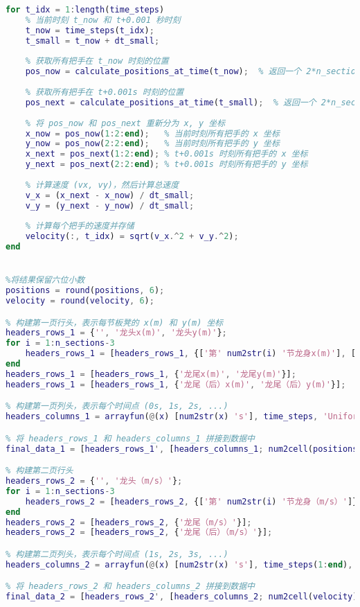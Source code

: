 \documentclass[withoutpreface,bwprint]{cumcmthesis1} %
\begin{document}
\begin{appendices}
\begin{lstlisting}[language=matlab]
% 计算整数秒之间的速度，使用 t 和 t+0.0001 之间的位移来计算
for t_idx = 1:length(time_steps)
    % 当前时刻 t_now 和 t+0.001 秒时刻
    t_now = time_steps(t_idx);
    t_small = t_now + dt_small;
    
    % 获取所有把手在 t_now 时刻的位置
    pos_now = calculate_positions_at_time(t_now);  % 返回一个 2*n_sections 大小的向量
    
    % 获取所有把手在 t+0.001s 时刻的位置
    pos_next = calculate_positions_at_time(t_small);  % 返回一个 2*n_sections 大小的向量
    
    % 将 pos_now 和 pos_next 重新分为 x, y 坐标
    x_now = pos_now(1:2:end);   % 当前时刻所有把手的 x 坐标
    y_now = pos_now(2:2:end);   % 当前时刻所有把手的 y 坐标
    x_next = pos_next(1:2:end); % t+0.001s 时刻所有把手的 x 坐标
    y_next = pos_next(2:2:end); % t+0.001s 时刻所有把手的 y 坐标
    
    % 计算速度 (vx, vy)，然后计算总速度
    v_x = (x_next - x_now) / dt_small;
    v_y = (y_next - y_now) / dt_small;
    
    % 计算每个把手的速度并存储
    velocity(:, t_idx) = sqrt(v_x.^2 + v_y.^2);
end


%将结果保留六位小数
positions = round(positions, 6);
velocity = round(velocity, 6);

% 构建第一页行头，表示每节板凳的 x(m) 和 y(m) 坐标
headers_rows_1 = {'', '龙头x(m)', '龙头y(m)'};
for i = 1:n_sections-3
    headers_rows_1 = [headers_rows_1, {['第' num2str(i) '节龙身x(m)'], ['第' num2str(i) '节龙身y(m)']}];
end
headers_rows_1 = [headers_rows_1, {'龙尾x(m)', '龙尾y(m)'}];
headers_rows_1 = [headers_rows_1, {'龙尾（后）x(m)', '龙尾（后）y(m)'}];

% 构建第一页列头，表示每个时间点 (0s, 1s, 2s, ...)
headers_columns_1 = arrayfun(@(x) [num2str(x) 's'], time_steps, 'UniformOutput', false);

% 将 headers_rows_1 和 headers_columns_1 拼接到数据中
final_data_1 = [headers_rows_1', [headers_columns_1; num2cell(positions)]];

% 构建第二页行头
headers_rows_2 = {'', '龙头（m/s）'};
for i = 1:n_sections-3
    headers_rows_2 = [headers_rows_2, {['第' num2str(i) '节龙身（m/s）']}];
end
headers_rows_2 = [headers_rows_2, {'龙尾（m/s）'}];
headers_rows_2 = [headers_rows_2, {'龙尾（后）（m/s）'}];

% 构建第二页列头，表示每个时间点 (1s, 2s, 3s, ...)
headers_columns_2 = arrayfun(@(x) [num2str(x) 's'], time_steps(1:end), 'UniformOutput', false);

% 将 headers_rows_2 和 headers_columns_2 拼接到数据中
final_data_2 = [headers_rows_2', [headers_columns_2; num2cell(velocity)]];


\end{lstlisting}
\end{appendices}
\end{document}
